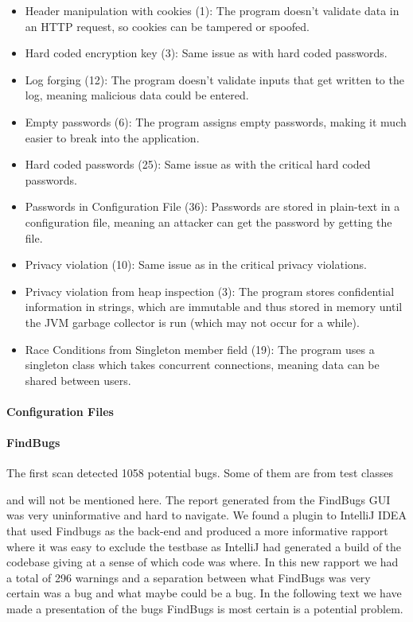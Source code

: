 \documentclass{report} %
\begin{document}
  \begin{itemize}
  \item Header manipulation with cookies (1): The program doesn't validate data
    in an HTTP request, so cookies can be tampered or spoofed.
  \item Hard coded encryption key (3): Same issue as with hard coded passwords.
  \item Log forging (12): The program doesn't validate inputs that get written
    to the log, meaning malicious data could be entered.
  \item Empty passwords (6): The program assigns empty passwords, making it much
    easier to break into the application.
  \item Hard coded passwords (25): Same issue as with the critical hard coded passwords.
  \item Passwords in Configuration File (36): Passwords are stored in plain-text
    in a configuration file, meaning an attacker can get the password by getting
    the file.
  \item Privacy violation (10): Same issue as in the critical privacy violations.
  \item Privacy violation from heap inspection (3): The program stores
    confidential information in strings, which are immutable and thus stored in
    memory until the JVM garbage collector is run (which may not occur for a
    while). 
  \item Race Conditions from Singleton member field (19): The program uses a
    singleton class which takes concurrent connections, meaning data can be
    shared between users.
  \end{itemize}
      
\paragraph{Configuration Files}  

\paragraph{FindBugs}

  The first scan detected 1058 potential bugs. Some of them are from test classes

  and will not be mentioned here. The report generated from the FindBugs GUI was
  very uninformative and hard to navigate. We found a plugin to IntelliJ IDEA
  that used Findbugs as the back-end and produced a more informative rapport
  where it was easy to exclude the testbase as IntelliJ had generated a build of the
  codebase giving at a sense of which code was where. In this new rapport we
  had a total of 296 warnings and a separation between what FindBugs was very
  certain was a bug and what maybe could be a bug. In the following text we have
  made a presentation of the bugs FindBugs is most certain is a potential
  problem.
\end{document}
